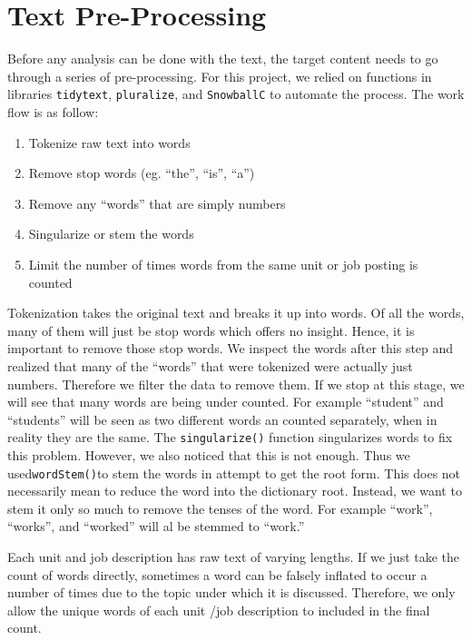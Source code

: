 \documentclass[
  letterpaper,
]{report}
\providecommand{\tightlist}{%
  \setlength{\itemsep}{0pt}\setlength{\parskip}{0pt}}\usepackage{longtable,booktabs,array}
\begin{document}
\hypertarget{sec-preprocess}{%
\chapter{Text Pre-Processing}\label{sec-preprocess}}

Before any analysis can be done with the text, the target content needs
to go through a series of pre-processing. For this project, we relied on
functions in libraries \texttt{tidytext}, \texttt{pluralize}, and
\texttt{SnowballC} to automate the process. The work flow is as follow:

\begin{enumerate}
\def\labelenumi{\arabic{enumi}.}
\tightlist
\item
  Tokenize raw text into words
\item
  Remove stop words (eg. ``the'', ``is'', ``a'')
\item
  Remove any ``words'' that are simply numbers
\item
  Singularize or stem the words
\item
  Limit the number of times words from the same unit or job posting is
  counted
\end{enumerate}

Tokenization takes the original text and breaks it up into words. Of all
the words, many of them will just be stop words which offers no insight.
Hence, it is important to remove those stop words. We inspect the words
after this step and realized that many of the ``words'' that were
tokenized were actually just numbers. Therefore we filter the data to
remove them. If we stop at this stage, we will see that many words are
being under counted. For example ``student'' and ``students'' will be
seen as two different words an counted separately, when in reality they
are the same. The \texttt{singularize()} function singularizes words to
fix this problem. However, we also noticed that this is not enough. Thus
we used\texttt{wordStem()}to stem the words in attempt to get the root
form. This does not necessarily mean to reduce the word into the
dictionary root. Instead, we want to stem it only so much to remove the
tenses of the word. For example ``work'', ``works'', and ``worked'' will
al be stemmed to ``work.''

Each unit and job description has raw text of varying lengths. If we
just take the count of words directly, sometimes a word can be falsely
inflated to occur a number of times due to the topic under which it is
discussed. Therefore, we only allow the unique words of each unit /job
description to included in the final count.
\end{document}
